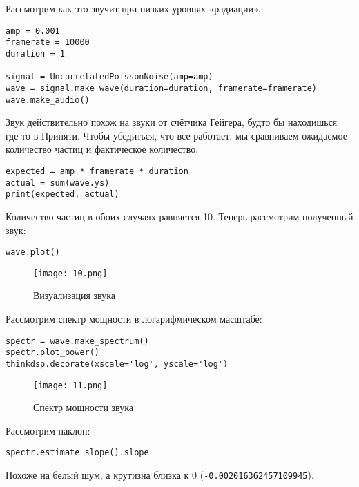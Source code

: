 \documentclass[a4paper,12pt]{report}
\begin{document}
Рассмотрим как это звучит при низких уровнях «радиации».

\begin{lstlisting}[caption=Создание звука]
amp = 0.001
framerate = 10000
duration = 1

signal = UncorrelatedPoissonNoise(amp=amp)
wave = signal.make_wave(duration=duration, framerate=framerate)
wave.make_audio()
\end{lstlisting}

Звук действительно похож на звуки от счётчика Гейгера, будто бы находишься где-то в Припяти. Чтобы убедиться, что все работает, мы сравниваем ожидаемое количество частиц и фактическое количество:

\begin{lstlisting}[caption=Создание звука]
expected = amp * framerate * duration
actual = sum(wave.ys)
print(expected, actual)
\end{lstlisting}

Количество частиц в обоих случаях равняется 10. Теперь рассмотрим полученный звук:

\begin{lstlisting}[caption=Визуализация звука]
wave.plot()
\end{lstlisting}

\begin{figure}[H]
        \centering
        \texttt{[image: 10.png]}
        \caption{Визуализация звука}
        \label{fig:lab4_fig4_1}
\end{figure}

Рассмотрим спектр мощности в логарифмическом масштабе:

\begin{lstlisting}[caption=Спектр мощности звука]
spectr = wave.make_spectrum()
spectr.plot_power()
thinkdsp.decorate(xscale='log', yscale='log')
\end{lstlisting}

\begin{figure}[H]
        \centering
        \texttt{[image: 11.png]}
        \caption{Спектр мощности звука}
        \label{fig:lab4_fig4_2}
\end{figure}

Рассмотрим наклон:

\begin{lstlisting}[caption=Наклон прямой]
spectr.estimate_slope().slope
\end{lstlisting}

Похоже на белый шум, а крутизна близка к 0 (\texttt{-0.002016362457109945}).
\end{document}
